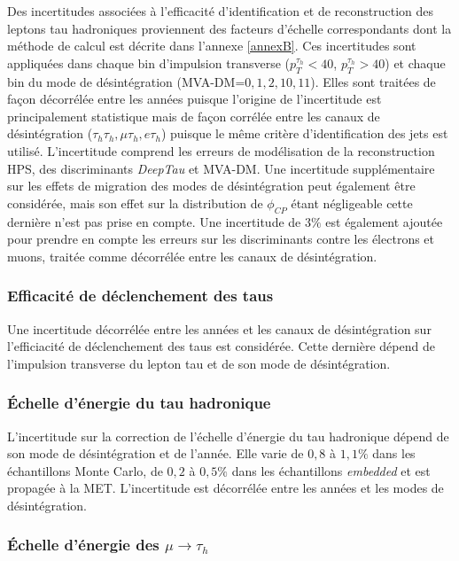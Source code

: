 Des incertitudes associées à l'efficacité d'identification et de reconstruction des leptons tau hadroniques proviennent des facteurs d'échelle correspondants dont la méthode de calcul est décrite dans l'annexe \ref{annexB}. Ces incertitudes sont appliquées dans chaque bin d'impulsion transverse ($p_{T}^{\tau_h}<40$, $p_{T}^{\tau_h}>40$) et chaque bin du mode de désintégration (MVA-DM=$0,1,2,10,11$). Elles sont traitées de façon décorrélée entre les années puisque l'origine de l'incertitude est principalement statistique mais de façon corrélée entre les canaux de désintégration ($\tau_h\tau_h, \mu\tau_h, e\tau_h$) puisque le même critère d'identification des jets est utilisé. L'incertitude comprend les erreurs de modélisation de la reconstruction HPS, des discriminants \textit{DeepTau} et MVA-DM. Une incertitude supplémentaire sur les effets de migration des modes de désintégration peut également être considérée, mais son effet sur la distribution de $\phi_{CP}$ étant négligeable cette dernière n'est pas prise en compte. Une incertitude de $3\%$ est également ajoutée pour prendre en compte les erreurs sur les discriminants contre les électrons et muons, traitée comme décorrélée entre les canaux de désintégration.

\subsubsection{ Efficacité de déclenchement des taus}

Une incertitude décorrélée entre les années et les canaux de désintégration sur l'efficiacité de déclenchement des taus est considérée. Cette dernière dépend de l'impulsion transverse du lepton tau et de son mode de désintégration.

\subsubsection{ Échelle d'énergie du tau hadronique}

L'incertitude sur la correction de l'échelle d'énergie du tau hadronique dépend de son mode de désintégration et de l'année. Elle varie de $0,8$ à $1,1\%$ dans les échantillons Monte Carlo, de $0,2$ à $0,5\%$ dans les échantillons \textit{embedded} et est propagée à la MET. L'incertitude est décorrélée entre les années et les modes de désintégration. 

\subsubsection{ Échelle d'énergie des $\mu\rightarrow\tau_h$}

